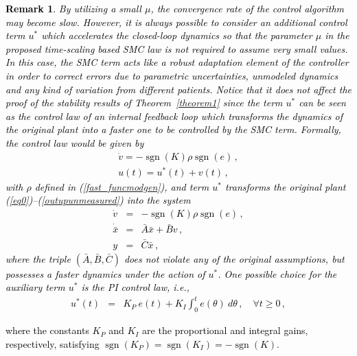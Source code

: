 \documentclass[review]{elsarticle}
\newtheorem{remark}{Remark}
\newcommand{\sgn}{\operatorname{sgn}}
\begin{document}


\textcolor{black}{
\begin{remark}
By utilizing a small $\mu$, the convergence rate of the control algorithm may become slow. However, it is always possible to consider an additional control term $u^*$ which accelerates the closed-loop dynamics so that the parameter $\mu$ in the proposed time-scaling based SMC law is not required to assume very small values. In this case, the SMC term acts like \textcolor{black}{a} robust adaptation element of the controller in order to correct errors due to parametric uncertainties, unmodeled dynamics and any kind of variation from different patients. Notice that it does not affect the proof of the stability results of Theorem~\ref{theorem1} since the term $u^*$ 
can be seen as the control law of an internal feedback loop which transforms the dynamics of the original plant into a faster one to be controlled by the SMC term. Formally, the control law would be given by
%
\begin{eqnarray} \label{cococococo1}
\dot v = -\sgn(K)\rho\sgn(e) \,, \\
u(t)=u^*(t)+v(t) \,, \label{cococococo2}  
\end{eqnarray}
%
with $\rho$ defined in (\ref{fast_funcmodgen}), and term $u^*$ transforms the original plant (\ref{eq0})--(\ref{outupunmeasured}) into the system 
\begin{eqnarray}
    \dot v &=& -\sgn(K)\rho\sgn(e) \,,      \label{eq0_salvation}\\
    \dot{\bar{x}}&=& \bar{A}\bar{x}+\bar{B}v \,,  \label{eq1_salvation}  \\
    y&=&\bar{C}\bar{x} \,,            \label{outupunmeasured_salvation}
\end{eqnarray}
%
where the triple $(\bar{A},\bar{B},\bar{C})$ does not violate any of the original assumptions, but possesses a faster dynamics under the action of $u^*$. One possible choice for the auxiliary term $u^*$ is the PI control law, i.e.,
\begin{eqnarray} \label{PID}
    u^*(t) &=& K_P ~e(t) + K_I\int_{0}^{t} e(\theta)~ d\theta \,, \quad \forall t \geq 0 \,,
\end{eqnarray}
% 
\end{remark}
where the constants $K_P$ and $K_I$ are the proportional and integral gains, respectively, satisfying $\sgn(K_P)=\sgn(K_I)=-\sgn(K)$.
}
\end{document}
